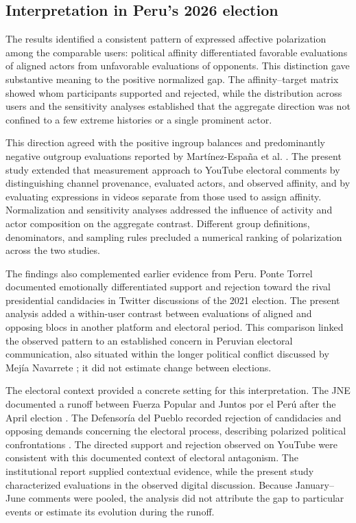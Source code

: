 \documentclass[conference,letterpaper]{IEEEtran}
\begin{document}
\subsection{Interpretation in Peru's 2026 election}
The results identified a consistent pattern of expressed affective polarization among the comparable users: political affinity differentiated favorable evaluations of aligned actors from unfavorable evaluations of opponents. This distinction gave substantive meaning to the positive normalized gap. The affinity--target matrix showed whom participants supported and rejected, while the distribution across users and the sensitivity analyses established that the aggregate direction was not confined to a few extreme histories or a single prominent actor.

This direction agreed with the positive ingroup balances and predominantly negative outgroup evaluations reported by Martínez-España et al. \cite{polariz}. The present study extended that measurement approach to YouTube electoral comments by distinguishing channel provenance, evaluated actors, and observed affinity, and by evaluating expressions in videos separate from those used to assign affinity. Normalization and sensitivity analyses addressed the influence of activity and actor composition on the aggregate contrast. Different group definitions, denominators, and sampling rules precluded a numerical ranking of polarization across the two studies.

The findings also complemented earlier evidence from Peru. Ponte Torrel \cite{Ponte2022} documented emotionally differentiated support and rejection toward the rival presidential candidacies in Twitter discussions of the 2021 election. The present analysis added a within-user contrast between evaluations of aligned and opposing blocs in another platform and electoral period. This comparison linked the observed pattern to an established concern in Peruvian electoral communication, also situated within the longer political conflict discussed by Mejía Navarrete \cite{Mejia2024}; it did not estimate change between elections.

The electoral context provided a concrete setting for this interpretation. The JNE documented a runoff between Fuerza Popular and Juntos por el Perú after the April election \cite{JNE11352026}. The Defensoría del Pueblo recorded rejection of candidacies and opposing demands concerning the electoral process, describing polarized political confrontations \cite{Defensoria2842026}. The directed support and rejection observed on YouTube were consistent with this documented context of electoral antagonism. The institutional report supplied contextual evidence, while the present study characterized evaluations in the observed digital discussion. Because January--June comments were pooled, the analysis did not attribute the gap to particular events or estimate its evolution during the runoff.
\end{document}
